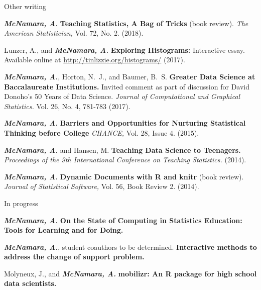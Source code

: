 \documentclass{resume} %
\begin{document}
\clearpage
\begin{rSection}{Other writing}

{\bf \em McNamara, A.} {\bf Teaching Statistics, A Bag of Tricks} (book review). {\em The American Statistician,} Vol. 72, No. 2. (2018). 

 
Lunzer, A., and {\bf \em McNamara, A.} {\bf Exploring Histograms:} Interactive essay. Available online at \url{http://tinlizzie.org/histograms/} (2017).

{\bf \em McNamara, A.}, Horton, N.~J., and Baumer, B.~S. {\bf Greater Data Science at Baccalaureate Institutions.} Invited comment as part of discussion for David Donoho's 50 Years of Data Science. {\em Journal of Computational and Graphical Statistics.} Vol. 26, No. 4, 781-783 (2017). 

{\bf \em McNamara, A.} {\bf Barriers and Opportunities for Nurturing Statistical Thinking before College}{ \em CHANCE,} Vol. 28, Issue 4. (2015).

{\bf \em McNamara, A. }and Hansen, M. {\bf Teaching Data Science to Teenagers.}{ \em Proceedings of the 9th International Conference on Teaching Statistics.} (2014). 

{\bf \em McNamara, A. }{\bf Dynamic Documents with R and knitr} (book review). {\em Journal of Statistical Software,}{ Vol. 56, Book Review 2.} (2014).
\end{rSection}


\begin{rSection}{In progress}

{\bf \em{McNamara, A.}} {\bf On the State of Computing in Statistics Education: Tools for Learning and for Doing. } 

{\bf \em{McNamara, A.}}, student coauthors to be determined. {\bf Interactive methods to address the change of support problem. } 

Molyneux, J., and {\bf \em McNamara, A.} {\bf mobilizr: An R package for high school data scientists.}

\end{rSection}


\end{document}
